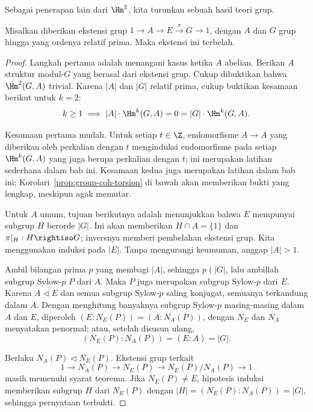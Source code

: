 Sebagai penerapan lain dari $\Hm^2$, kita turunkan sebuah hasil teori grup.

\begin{theorem}\label{prop:Schur-Zassenhaus}
	Misalkan diberikan ekstensi grup $1\to A\to E\xrightarrow{\pi}G\to1$, dengan $A$
	dan $G$ grup hingga yang ordenya relatif prima. Maka ekstensi ini terbelah.
\end{theorem}
\begin{proof}
	Langkah pertama adalah menangani kasus ketika $A$ abelian. Berikan $A$
	struktur modul-$G$ yang berasal dari ekstensi grup. Cukup dibuktikan bahwa
	$\Hm^2(G,A)$ trivial. Karena $|A|$ dan $|G|$
	relatif prima, cukup buktikan kesamaan berikut untuk $k=2$:
	\[ k\geq1\implies |A|\cdot\Hm^k(G,A)=0
	=|G|\cdot\Hm^k(G,A). \]

	Kesamaan pertama mudah. Untuk setiap $t\in\Z$, endomorfisme $A\to A$ yang
	diberikan oleh perkalian dengan $t$ menginduksi endomorfisme pada setiap
	$\Hm^k(G,A)$ yang juga berupa perkalian dengan $t$; ini merupakan latihan
	sederhana dalam bab ini. Kesamaan kedua juga merupakan latihan dalam bab
	ini; Korolari~\ref{prop:group-coh-torsion} di bawah akan memberikan bukti yang
	lengkap, meskipun agak memutar.

	Untuk $A$ umum, tujuan berikutnya adalah menunjukkan bahwa $E$ mempunyai
	subgrup $H$ berorde $|G|$. Ini akan memberikan $H\cap A=\{1\}$ dan
	$\pi|_H:H\rightiso G$; inversnya memberi pembelahan ekstensi grup. Kita
	menggunakan induksi pada $|E|$. Tanpa mengurangi keumuman, anggap $|A|>1$.

	Ambil bilangan prima $p$ yang membagi $|A|$, sehingga $p\nmid|G|$, lalu
	ambillah subgrup Sylow-$p$ $P$ dari $A$. Maka $P$ juga merupakan subgrup
	Sylow-$p$ dari $E$. Karena $A\lhd E$ dan semua subgrup Sylow-$p$ saling
	konjugat, semuanya terkandung dalam $A$. Dengan menghitung banyaknya
	subgrup Sylow-$p$ masing-masing dalam $A$ dan $E$, diperoleh
	$(E:N_E(P))=(A:N_A(P))$, dengan $N_E$ dan $N_A$ menyatakan penormal; atau,
	setelah disusun ulang,
	\[ (N_E(P):N_A(P))=(E:A)=|G|. \]

	Berlaku $N_A(P)\lhd N_E(P)$. Ekstensi grup terkait
	\[ 1\to N_A(P)\to N_E(P)\to N_E(P)/N_A(P)\to1 \]
	masih memenuhi syarat teorema. Jika $N_E(P)\neq E$, hipotesis induksi
	memberikan subgrup $H$ dari $N_E(P)$ dengan
	$|H|=(N_E(P):N_A(P))=|G|$, sehingga pernyataan terbukti.


\end{proof}
